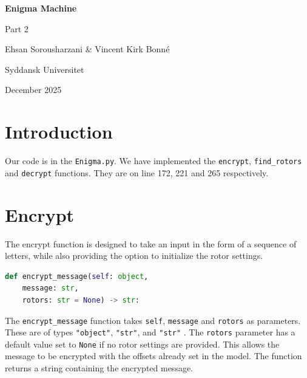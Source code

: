 \documentclass{article}
\begin{document}
\begin{titlepage}
    \centering



    {\Huge\bfseries Enigma Machine\par}
    \vspace{0.4cm}
    {\Large Part 2\par}
    \vspace{2cm}

    {\large
    Ehsan Sorousharzani \&
    Vincent Kirk Bonné\par}
    \vspace{1.5cm}


    {\large Syddansk Universitet\par}
    \vspace{0.5cm}

    {\large December 2025\par}

    \vfill
\end{titlepage}


\tableofcontents
\newpage


\section{Introduction}

Our code is in the \verb|Enigma.py|. We have implemented the \verb|encrypt|, \verb|find_rotors| and \verb|decrypt| functions. They are on line 172, 221 and 265 respectively.

\section{Encrypt}
The encrypt function is designed to take an input in the form of a sequence of letters, while also providing the option to initialize the rotor settings.

\begin{lstlisting}[language=Python]
def encrypt_message(self: object,
    message: str,
    rotors: str = None) -> str:
\end{lstlisting}

The \verb|encrypt_message| function takes \verb|self|, \verb|message| and \verb|rotors| as parameters. These are of types \verb|"object"|, \verb|"str"|, and \verb|"str"| . The \verb|rotors| parameter has a default value set to \verb|None| if no rotor settings are provided. This allows the message to be encrypted with the offsets already set in the model. The function returns a string containing the encrypted message.
\end{document}
